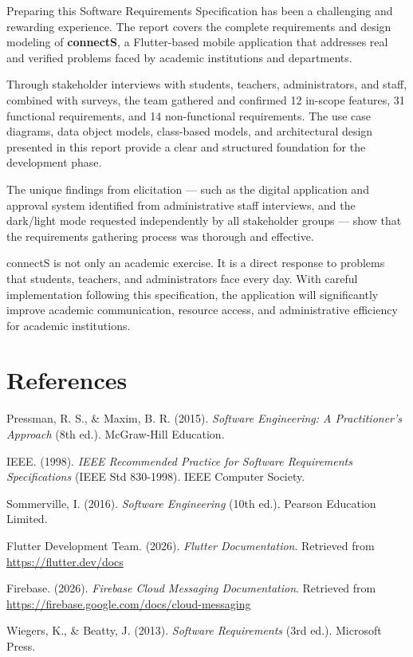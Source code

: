 \documentclass[12pt,a4paper]{article}
\begin{document}
Preparing this Software Requirements Specification has been a challenging and rewarding experience. The report covers the complete requirements and design modeling of \textbf{connectS}, a Flutter-based mobile application that addresses real and verified problems faced by academic institutions and departments.

Through stakeholder interviews with students, teachers, administrators, and staff, combined with surveys, the team gathered and confirmed 12 in-scope features, 31 functional requirements, and 14 non-functional requirements. The use case diagrams, data object models, class-based models, and architectural design presented in this report provide a clear and structured foundation for the development phase.

The unique findings from elicitation --- such as the digital application and approval system identified from administrative staff interviews, and the dark/light mode requested independently by all stakeholder groups --- show that the requirements gathering process was thorough and effective.

connectS is not only an academic exercise. It is a direct response to problems that students, teachers, and administrators face every day. With careful implementation following this specification, the application will significantly improve academic communication, resource access, and administrative efficiency for academic institutions.

\newpage
\section*{References}

\begin{enumerate}[leftmargin=*, label={[\arabic*]}, itemsep=5pt]
  \item Pressman, R. S., \& Maxim, B. R. (2015). \textit{Software Engineering: A Practitioner's Approach} (8th ed.). McGraw-Hill Education.
  \item IEEE. (1998). \textit{IEEE Recommended Practice for Software Requirements Specifications} (IEEE Std 830-1998). IEEE Computer Society.
  \item Sommerville, I. (2016). \textit{Software Engineering} (10th ed.). Pearson Education Limited.
  \item Flutter Development Team. (2026). \textit{Flutter Documentation}. Retrieved from \url{https://flutter.dev/docs}
  \item Firebase. (2026). \textit{Firebase Cloud Messaging Documentation}. Retrieved from \url{https://firebase.google.com/docs/cloud-messaging}
  \item Wiegers, K., \& Beatty, J. (2013). \textit{Software Requirements} (3rd ed.). Microsoft Press.
\end{enumerate}
\end{document}
